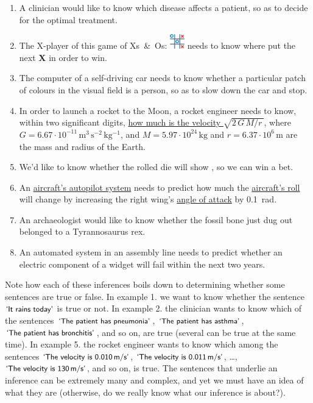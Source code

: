 \documentclass[
  a4paper,
  DIV=11,
  numbers=noendperiod,
  oneside]{scrreprt}
\begin{document}
\begin{enumerate}
\def\labelenumi{\arabic{enumi}.}
\setcounter{enumi}{1}
\item
  A clinician would like to know which disease affects a patient, so as
  to decide for the optimal treatment.
\item
  The X-player of this game of Xs~\&~Os:
  \includegraphics[width=0.05\textwidth,height=\textheight]{XsOs.png}
  needs to know where put the next {\textbf{X}} in order to win.
\item
  The computer of a self-driving car needs to know whether a particular
  patch of colours in the visual field is a person, so as to slow down
  the car and stop.
\item
  In order to launch a rocket to the Moon, a rocket engineer needs to
  know, within two significant digits,
  \href{http://nasaphysics.cet.edu/escape-velocity.html}{how much is the
  velocity \(\sqrt{2\,G\,M/r\,}\)}, where
  \(G=6.67 \cdot 10^{-11}\,\mathrm{m^3\,s^{-2}\,kg^{-1}}\), and
  \(M = 5.97 \cdot 10^{24}\,\mathrm{kg}\) and
  \(r = 6.37 \cdot 10^{6}\,\mathrm{m}\) are the mass and radius of the
  Earth.
\item
  We'd like to know whether the rolled die will show ,
  so we can win a bet.
\item
  An
  \href{https://aerospaceamerica.aiaa.org/features/a-i-in-the-cockpit}{aircraft's
  autopilot system} needs to predict how much the
  \href{https://www.grc.nasa.gov/www/k-12/VirtualAero/BottleRocket/airplane/roll.html}{aircraft's
  roll} will change by increasing the right wing's
  \href{https://www.grc.nasa.gov/www/k-12/VirtualAero/BottleRocket/airplane/incline.html}{angle
  of attack} by 0.1~rad.
\item
  An archaeologist would like to know whether the fossil bone just dug
  out belonged to a Tyrannosaurus rex.
\item
  An automated system in an assembly line needs to predict whether an
  electric component of a widget will fail within the next two years.
\end{enumerate}

Note how each of these inferences boils down to determining whether some
sentences are true or false. In example 1. we want to know whether the
sentence \(\textsf{\small`It rains today'}\) is true or not. In example
2. the clinician wants to know which of the sentences
\(\textsf{\small`The patient has pneumonia'}\),
\(\textsf{\small`The patient has asthma'}\),
\(\textsf{\small`The patient has bronchitis'}\), and so on, are true
(several can be true at the same time). In example 5. the rocket
engineer wants to know which among the sentences
\(\textsf{\small`The velocity is 0.010\,m/s'}\),
\(\textsf{\small`The velocity is 0.011\,m/s'}\), \ldots,
\(\textsf{\small`The velocity is 130\,m/s'}\), and so on, is true. The
sentences that underlie an inference can be extremely many and complex,
and yet we must have an idea of what they are (otherwise, do we really
know what our inference is about?).
\end{document}
